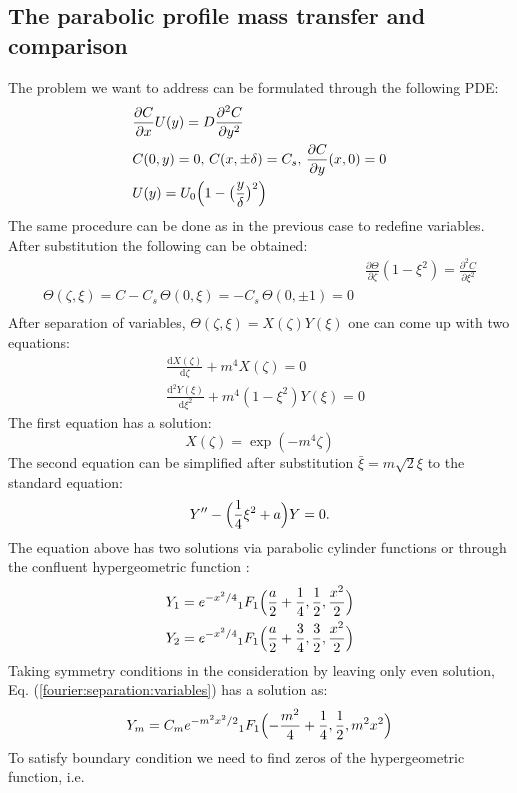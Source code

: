 \documentclass{article}
\newcommand{\beq}{\begin{equation}}
\newcommand{\feq}{\end{equation}}
\begin{document}
\subsection{The parabolic profile mass transfer and comparison}
The problem we want to address can be formulated through the following PDE:
\beq
\begin{aligned}
&\frac{\partial C}{\partial x} U(y)=D\frac{\partial^2 C}{\partial y^2}\\
&C(0,y)=0,\, C(x,\pm \delta)=C_s,\, \frac{\partial C}{\partial y }(x,0)=0\\
&U(y)=U_0 \Bigl(1-\bigl(\frac{y}{\delta}\bigr)^2\Bigr)
\end{aligned}
\feq
The same procedure can be done as in the previous case to redefine variables. After substitution
the following can be obtained:
\beq
\begin{aligned}
&\frac{\partial \Theta}{\partial \zeta}(1-\xi^2)=\frac{\partial^2 C}{\partial \xi^2}\\
\Theta(\zeta,\xi)=C-C_s\,\Theta(0,\xi)=-C_s\,\Theta(0,\pm 1)=0\\
\end{aligned}
\feq
After separation of variables, $\Theta(\zeta,\xi)=X(\zeta)Y(\xi)$ one can come up with two
equations:
\beq
\label{fourier:separation:variables}
\begin{aligned}
&\frac{\mathrm{d}X(\zeta)}{\mathrm{d}\zeta}+m^4 X(\zeta)=0\\
&\frac{\mathrm{d^2}Y(\xi)}{\mathrm{d}\xi^2}+m^4 (1-\xi^2) Y(\xi)=0
\end{aligned}
\feq
The first equation has a solution:
\beq
X(\zeta)=\exp(-m^4 \zeta)
\feq
The second equation can be simplified after substitution $\bar{\xi}=m \sqrt{2} \xi$ to the standard
equation:
\beq
Y''-\Bigl(\frac{1}{4}\xi^2+a\Bigr)Y=0.
\feq
The equation above has two solutions via parabolic cylinder functions or through the confluent
hypergeometric function \cite{abramowitz}:
\beq
\begin{aligned}
&Y_1=e^{-x^2/4} {_1F_1}\Bigl(\frac{a}{2}+\frac{1}{4},\frac{1}{2},\frac{x^2}{2}\Bigr)\\
&Y_2=e^{-x^2/4} {_1F_1}\Bigl(\frac{a}{2}+\frac{3}{4},\frac{3}{2},\frac{x^2}{2}\Bigr)\\
\end{aligned}
\feq 
Taking symmetry conditions in the consideration by leaving only even solution, Eq.
(\ref{fourier:separation:variables}) has a solution as:
\beq
Y_m=C_m e^{-m^2 x^2/2} {_1F_1}\Bigl(-\frac{m^2}{4}+\frac{1}{4},\frac{1}{2},m^2 x^2\Bigr) 
\feq
To satisfy boundary condition we need to find zeros of the hypergeometric function, i.e.
\end{document}
